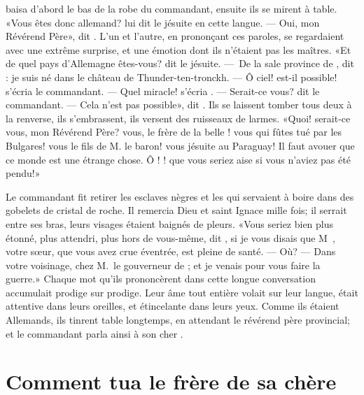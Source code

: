  baisa d’abord le bas de la robe du commandant, ensuite ils se
mirent à table. «Vous êtes donc allemand? lui dit le jésuite en cette
langue. — Oui, mon 
Révérend
Père», dit . L’un et l’autre, en
prononçant ces paroles, se regardaient avec une extrême surprise, et
une émotion dont ils n’étaient pas les maîtres. «Et de quel pays
d’Allemagne êtes-vous? dit le jésuite. — De la sale province de
, dit : je suis né dans le château de
Thunder-ten-tronckh. — Ô ciel! est-il possible! s’écria le commandant.
— Quel miracle! s’écria . — Serait-ce vous? dit le commandant. — Cela
n’est pas possible», dit . Ils se laissent tomber tous deux à la
renverse, ils s’embrassent, ils versent des ruisseaux de larmes. «Quoi!
serait-ce vous, mon Révérend Père? vous, le frère de la belle
! vous qui fûtes tué par les Bulgares! vous le fils de
M. le baron! vous jésuite au Paraguay! Il faut avouer que ce
monde est une étrange chose. Ô ! ! que vous seriez aise
si vous n’aviez pas été pendu!»


Le commandant fit retirer les esclaves nègres et les  qui
servaient à boire dans des gobelets de cristal de roche. Il remercia
Dieu et saint Ignace mille fois; il serrait  entre ses bras,
leurs visages étaient baignés de pleurs. «Vous seriez bien plus étonné,
plus attendri, plus hors de vous-même, dit , si je vous disais
que M~, votre sœur, que vous avez crue éventrée,
est pleine de santé. — Où? — Dans votre voisinage, chez M.~le gouverneur de
 ; et je venais pour vous faire la guerre.» Chaque mot qu’ils
prononcèrent dans cette longue conversation accumulait prodige sur
prodige. Leur âme tout entière volait sur leur langue, était attentive
dans leurs oreilles, et étincelante dans leurs yeux. Comme ils étaient
Allemands, ils tinrent table longtemps, en attendant le révérend père
provincial; et le commandant parla ainsi à son cher .




\chapter[Comment \bname{Candide} tua le frère…]{Comment  tua le frère de sa chère }


